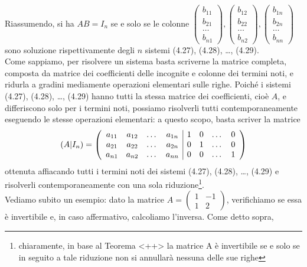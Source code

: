 \documentclass{book}
\begin{document}
Riassumendo, si ha $AB=I_n$ se e solo se le colonne $
\begin{pmatrix}
  b_{11}\\
  b_{21}\\
  \dots\\
  b_{n1}
\end{pmatrix},
\begin{pmatrix}
  b_{12}\\
  b_{22}\\
  \dots\\
  b_{n2}
\end{pmatrix},
\begin{pmatrix}
  b_{1n}\\
  b_{2n}\\
  \dots\\
  b_{nn}
\end{pmatrix}
$ sono soluzione rispettivamente degli $n$ sistemi (4.27), (4.28), \dots, (4.29).\\
Come sappiamo, per risolvere un sistema basta scriverne la matrice completa, composta da matrice dei
coefficienti delle incognite e colonne dei termini noti, e ridurla a gradini mediamente operazioni elementari
sulle righe. Poiché i sistemi (4.27), (4.28), \dots, (4.29) hanno tutti la stessa matrice dei coefficienti, cioè
$A$, e differiscono solo per i termini noti, possiamo risolverli tutti contemporaneamente eseguendo le stesse
operazioni elementari: a questo scopo, basta scriver la matrice
\begin{equation}
  \label{eq:4.30}
  (A|I_n)=\left(
    \begin{array}[center]{cccc|cccc}
      a_{11} & a_{12} & \dots & a_{1n} & 1 & 0 & \dots &0\\
      a_{21} & a_{22} & \dots & a_{2n} & 0 & 1 & \dots &0\\
      a_{n1} & a_{n2} & \dots & a_{nn} & 0 & 0 & \dots &1 
    \end{array}
    \right)
\end{equation}
ottenuta affiacando tutti i termini noti dei sistemi (4.27), (4.28), \dots, (4.29) e risolverli
contemporaneamente con una sola riduzione\footnote{chiaramente, in base al Teorema <++> la matrice A è
  invertibile se e solo se in seguito a tale riduzione non si annullarà nessuna delle sue righe}.\\
Vediamo subito un esempio: dato la matrice $A=
\begin{pmatrix}
  1 & -1\\
  1 & 2
\end{pmatrix}
$, verifichiamo se essa è invertibile e, in caso affermativo, calcoliamo l'inversa. Come detto sopra,
\end{document}
